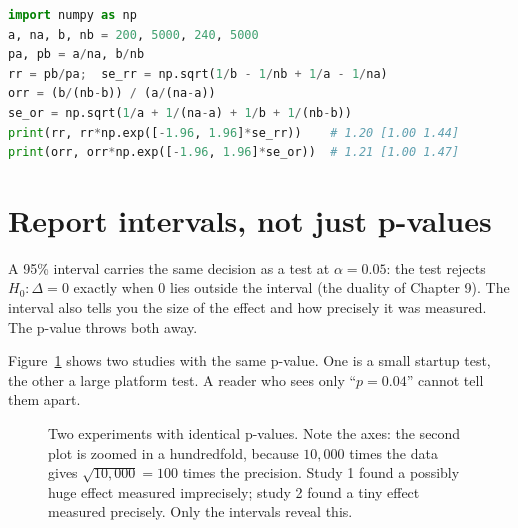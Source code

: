 \begin{lstlisting}[language=Python]
import numpy as np
a, na, b, nb = 200, 5000, 240, 5000
pa, pb = a/na, b/nb
rr = pb/pa;  se_rr = np.sqrt(1/b - 1/nb + 1/a - 1/na)
orr = (b/(nb-b)) / (a/(na-a))
se_or = np.sqrt(1/a + 1/(na-a) + 1/b + 1/(nb-b))
print(rr, rr*np.exp([-1.96, 1.96]*se_rr))    # 1.20 [1.00 1.44]
print(orr, orr*np.exp([-1.96, 1.96]*se_or))  # 1.21 [1.00 1.47]
\end{lstlisting}

\section{Report intervals, not just p-values}
\label{sec:pitfalls-reportci}

A 95\% interval carries the same decision as a test at $\alpha=0.05$: the test
rejects $H_0\colon \Delta=0$ exactly when $0$ lies outside the interval (the
duality of Chapter 9). The interval also tells you the size of the effect and how
precisely it was measured. The p-value throws both away.

Figure~\ref{fig:pitfalls-samep} shows two studies with the same p-value. One is a
small startup test, the other a large platform test. A reader who sees only
``$p=0.04$'' cannot tell them apart.

\begin{figure}[H]
\centering
{}
\caption{Two experiments with identical p-values. Note the axes: the second
plot is zoomed in a hundredfold, because $10{,}000$ times the data gives
$\sqrt{10{,}000}=100$ times the precision. Study 1 found a possibly huge effect measured
imprecisely; study 2 found a tiny effect measured precisely. Only the intervals
reveal this.}
\label{fig:pitfalls-samep}
\end{figure}

